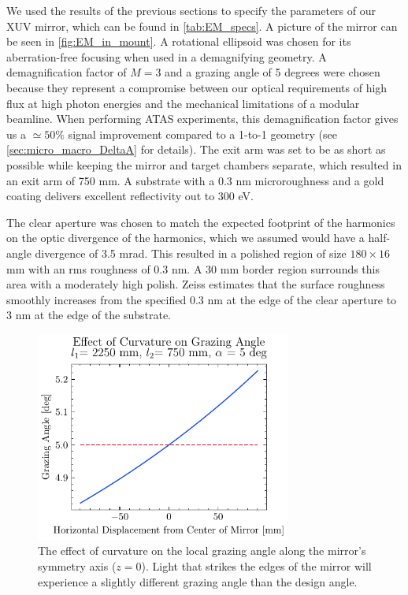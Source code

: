 We used the results of the previous sections to specify the parameters of our XUV mirror, which can be found in \cref{tab:EM_specs}. A picture of the mirror can be seen in \cref{fig:EM_in_mount}. A rotational ellipsoid was chosen for its aberration-free focusing when used in a demagnifying geometry. A demagnification factor of $M = 3$ and a grazing angle of 5 degrees were chosen because they represent a compromise between our optical requirements of high flux at high photon energies and the mechanical limitations of a modular beamline. When performing ATAS experiments, this demagnification factor gives us a $\simeq 50\%$ signal improvement compared to a 1-to-1 geometry (see \cref{sec:micro_macro_DeltaA} for details). The exit arm was set to be as short as possible while keeping the mirror and target chambers separate, which resulted in an exit arm of 750 mm. A substrate with a 0.3 nm microroughness and a gold coating delivers excellent reflectivity out to 300 eV.

The clear aperture was chosen to match the expected footprint of the harmonics on the optic divergence of the harmonics, which we assumed would have a half-angle divergence of 3.5 mrad. This resulted in a polished region of size $180 \times 16$ mm with an rms roughness of 0.3 nm. A 30 mm border region surrounds this area with a moderately high polish. Zeiss estimates that the surface roughness smoothly increases from the specified 0.3 nm at the edge of the clear aperture to 3 nm at the edge of the substrate.

\begin{figure}
	\centering
	\includegraphics[width=0.75\textwidth]{figures/chap2/EM_angle.pdf}
	\caption{The effect of curvature on the local grazing angle along the mirror's symmetry axis ($z=0$). Light that strikes the edges of the mirror will experience a slightly different grazing angle than the design angle.}
	\label{fig:EM_angle}
\end{figure}

